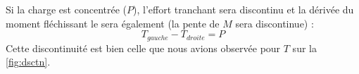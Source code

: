 	Si la charge est concentrée ($P$), l'effort tranchant sera discontinu et la 
	dérivée du moment fléchissant le sera également (la pente de $M$ sera 
	discontinue) :
	\begin{equation}
	T_{gauche} - T_{droite} = P
	\end{equation}
	Cette discontinuité est bien celle que nous avions observée pour $T$ sur 
	la \autoref{fig:dsctn}.
	
	
	
	
	
	
	
	
	
	
	
	
	
	
	
	
	
	
	
	
	
	
	
	
	
	
	
	
	
	
	
	
	
	
	